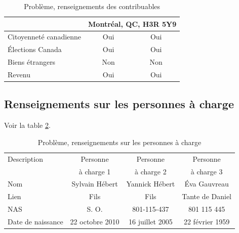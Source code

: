 \begin{table}
\begin{tabular}{|l|c|c|}
		                                         &  \multicolumn{2}{c|}{Montréal, QC, H3R 5Y9}   \\ \hline
		Citoyenneté canadienne                   &      Oui       &             Oui              \\ \hline
		Élections Canada                         &      Oui       &             Oui              \\ \hline
		Biens étrangers                          &      Non       &             Non              \\ \hline
		Revenu                                   &      Oui       &             Oui              \\ \hline
	\end{tabular}
	\caption[]{Problème, renseignements des contribuables}
	\label{table:chapitre4ProblemeRenseignementsContribuables}
\end{table}


\subsection{Renseignements sur les personnes à charge}
Voir la table \ref{table:chapitre4ProblemeRenseignementsPersonnesACharge}.
\begin{table}
	\centering
	\begin{tabular}{|l|c|c|c|}
		\hline
		\rowcolor{LightGreen} Description &    Personne     &    Personne     &    Personne     \\
		\rowcolor{LightGreen}             &   à charge 1    &   à charge 2    &   à charge 3    \\ \hline
		Nom                               & Sylvain Hébert  & Yannick Hébert  &  Éva Gauvreau   \\ \hline
		Lien                              &      Fils       &      Fils       & Tante de Daniel \\ \hline
		NAS                               &      S. O.      &   801-115-437   &   801 115 445   \\ \hline
		Date de naissance                 & 22 octobre 2010 & 16 juillet 2005 & 22 février 1959 \\ \hline
	\end{tabular}
	\caption[]{Problème, renseignements sur les personnes à charge}
	\label{table:chapitre4ProblemeRenseignementsPersonnesACharge}
\end{table}


